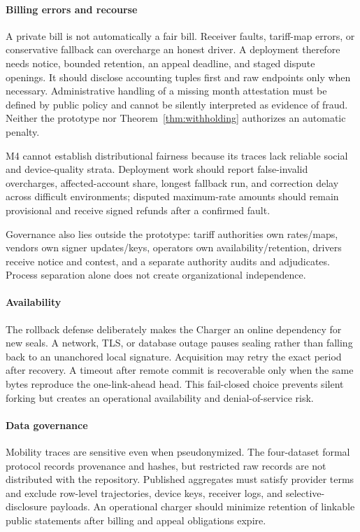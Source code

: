 \documentclass[conference]{IEEEtran}
\theoremstyle{plain}
\theoremstyle{definition}
\begin{document}
\paragraph{Billing errors and recourse}
A private bill is not automatically a fair bill. Receiver faults, tariff-map
errors, or conservative fallback can overcharge an honest driver. A deployment
therefore needs notice, bounded retention, an appeal deadline, and staged
dispute openings. It should disclose accounting tuples first and raw endpoints
only when necessary. Administrative handling of a missing month attestation must be
defined by public policy and cannot be silently interpreted as evidence of
fraud. Neither the prototype nor Theorem~\ref{thm:withholding} authorizes an
automatic penalty.

M4 cannot establish distributional fairness because its traces lack reliable
social and device-quality strata. Deployment work should report false-invalid
overcharges, affected-account share, longest fallback run, and correction delay
across difficult environments; disputed maximum-rate amounts should remain
provisional and receive signed refunds after a confirmed fault.

Governance also lies outside the prototype: tariff authorities own rates/maps,
vendors own signer updates/keys, operators own availability/retention, drivers
receive notice and contest, and a separate authority audits and adjudicates.
Process separation alone does not create organizational independence.

\paragraph{Availability}
The rollback defense deliberately makes the Charger an online dependency for
new seals. A network, TLS, or database outage pauses sealing rather than falling
back to an unanchored local signature. Acquisition may retry the exact period
after recovery. A timeout after remote commit is recoverable only when the same
bytes reproduce the one-link-ahead head. This fail-closed choice prevents silent
forking but creates an operational availability and denial-of-service risk.

\paragraph{Data governance}
Mobility traces are sensitive even when pseudonymized. The four-dataset formal
protocol records provenance and hashes, but restricted raw records are not
distributed with the repository. Published aggregates must satisfy provider
terms and exclude row-level trajectories, device keys, receiver logs, and
selective-disclosure payloads. An operational charger should minimize retention
of linkable public statements after billing and appeal obligations expire.
\end{document}
